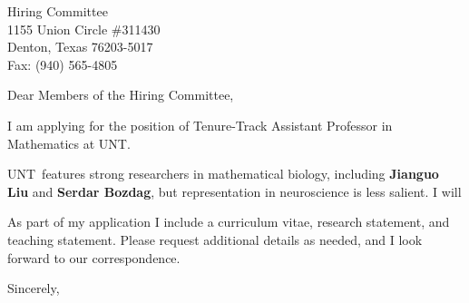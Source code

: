 \documentclass[11pt,a4paper]{letter}
\begin{document}
\def\School{UNT}
\begin{letter}
{Hiring Committee\\
1155 Union Circle \#311430\\
Denton, Texas 76203-5017\\
Fax: (940) 565-4805}


\opening{Dear Members of the Hiring Committee,}

I am applying for the position of Tenure-Track Assistant Professor in Mathematics at \School. 



\School~features strong researchers in mathematical biology, including \textbf{Jianguo Liu} and \textbf{Serdar Bozdag}, but representation in neuroscience is less salient. I will 



As part of my application I include a curriculum vitae, research statement, and teaching statement. Please request additional details as needed, and I look forward to our correspondence.

\closing{Sincerely,}
\end{letter}
\end{document}
